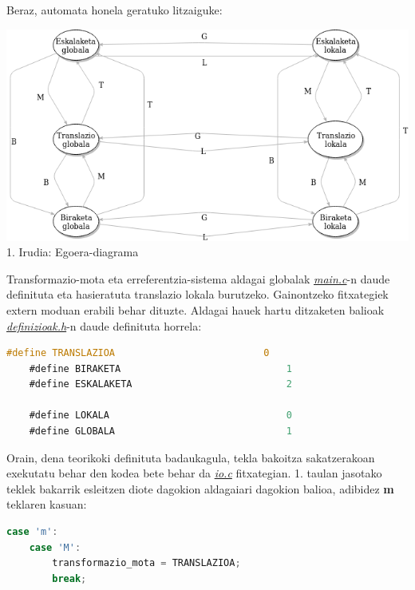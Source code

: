 \documentclass[12pt]{article}
\newcommand{\fitxategi}[1] {\underline{\textit{#1}}}
\newcommand{\tekla}[1] {\textbf{#1}}
\begin{document}
Beraz, automata honela geratuko litzaiguke:

\begin{center}
\includegraphics[scale=0.6]{egoeradiagrama.png}\\
\vspace{0.3cm}
1. Irudia: Egoera-diagrama
\end{center}


Transformazio-mota eta erreferentzia-sistema aldagai globalak \fitxategi{main.c}-n daude definituta eta hasieratuta translazio lokala burutzeko. Gainontzeko fitxategiek extern moduan erabili behar dituzte. Aldagai hauek hartu ditzaketen balioak \fitxategi{definizioak.h}-n daude definituta horrela:

\begin{center}
	\begin{lstlisting}[language=C, basicstyle=\footnotesize]
	#define TRANSLAZIOA                          0
	#define BIRAKETA                             1
	#define ESKALAKETA                           2
	
	#define LOKALA                               0
	#define GLOBALA                              1
	\end{lstlisting}
\end{center}


Orain, dena teorikoki definituta badaukagula, tekla bakoitza sakatzerakoan exekutatu behar den kodea bete behar da \fitxategi{io.c} fitxategian. 1. taulan jasotako teklek bakarrik esleitzen diote dagokion aldagaiari dagokion balioa, adibidez \tekla{m} teklaren kasuan:

\begin{center}
	\begin{lstlisting}[language=C, basicstyle=\footnotesize]
	case 'm':
	case 'M':
		transformazio_mota = TRANSLAZIOA;
		break;
	\end{lstlisting}
\end{center}
\end{document}

